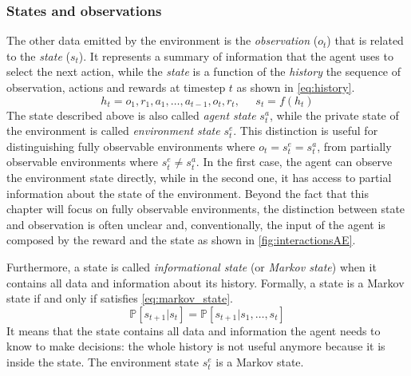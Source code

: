 \subsubsection{States and observations}

The other data emitted by the environment is the \textit{observation} ($o_t$) that is related to the \textit{state} ($s_t$). It represents a summary of information that the agent uses to select the next action, while the \textit{state} is a function of the \textit{history} the sequence of observation, actions and rewards at timestep $t$ as shown in \vref{eq:history}.
\begin{equation}\label{eq:history}
	h_t = o_1, r_1, a_1, \dots, a_{t-1}, o_{t}, r_t, \;\;\;\;\; s_t = f(h_t)
\end{equation}
The state described above is also called \textit{agent state} $s_t^a$, while the private state of the environment is called \textit{environment state} $s_t^e$. This distinction is useful for distinguishing fully observable environments where $o_t = s_t^e = s_t^a$, from partially observable environments where $s_t^e \neq s_t^a$.
In the first case, the agent can observe the environment state directly, while in the second one, it has access to partial information about the state of the environment.
Beyond the fact that this chapter will focus on fully observable environments, the distinction between state and observation is often unclear and, conventionally, the input of the agent is composed by the reward and the state as shown in \vref{fig:interactionsAE}.

Furthermore, a state is called \textit{informational state} (or \textit{Markov state}) when it contains all data and information about its history. Formally, a state is a Markov state if and only if satisfies \vref{eq:markov_state}.
\begin{equation} \label{eq:markov_state}
	\mathbb{P}[s_{t+1}| s_t] = \mathbb{P}[s_{t+1} | s_1, \dots, s_t]
\end{equation}
It means that the state contains all data and information the agent needs to know to make decisions: the whole history is not useful anymore because it is inside the state. The environment state $s_t^e$ is a Markov state.

